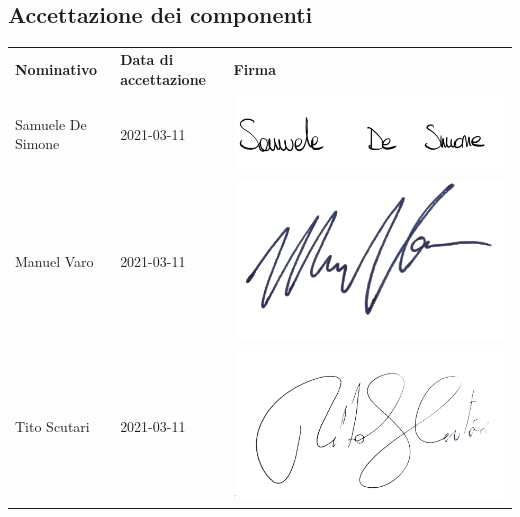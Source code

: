     \subsection{Accettazione dei componenti}
        \begin{center}
            \begin{table}[h!]
                \centering
                \renewcommand{\arraystretch}{1.8}
                \begin{tabular}{p{150px} p{110px} p{110px}}
                    \rowcolor{logo!70} \textbf{Nominativo} & \textbf{Data di accettazione} & \textbf{Firma}\\
                    Samuele De Simone & 2021-03-11 & \includegraphics[scale=0.06]{../../../Images/firme/firmaSamueleDeSimone.png} \\
                    Manuel Varo & 2021-03-11 & \includegraphics[scale=0.03]{../../../Images/firme/firmaManuelVaro.png} \\
                    Tito Scutari & 2021-03-11 & \includegraphics[scale=0.03]{../../../Images/firme/firmaTitoScutari.png} \\

\end{tabular}
\end{table}
\end{center}
